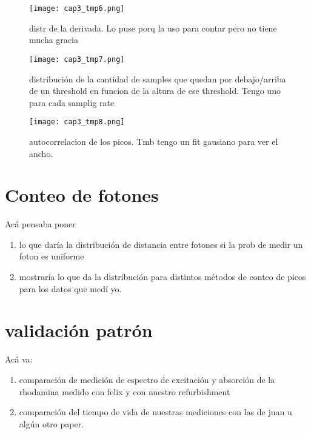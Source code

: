\begin{figure*}[h]
    \texttt{[image: cap3\_tmp6.png]}
    \caption{distr de la derivada. Lo puse porq la uso para contar pero no tiene mucha gracia}
    \label{fig:d}
\end{figure*}

\begin{figure*}[h]
    \texttt{[image: cap3\_tmp7.png]}
    \caption{distribución de la cantidad de samples que quedan por debajo/arriba de un threshold en funcion de la altura de ese threshold. Tengo uno para cada samplig rate}
    \label{fig:e}
\end{figure*}

\begin{figure*}[h]
    \texttt{[image: cap3\_tmp8.png]}
    \caption{autocorrelacion de los picos. Tmb tengo un fit gausiano para ver el ancho.}
    \label{fig:h}
\end{figure*}

\section{Conteo de fotones}

Acá pensaba poner 
\begin{enumerate}
    \item lo que daría la distribución de distancia entre fotones si la prob de medir un foton es uniforme
    \item mostraría lo que da la distribución para distintos métodos de conteo de picos para los datos que medí yo.
\end{enumerate}

\section{validación patrón}

Acá va:

\begin{enumerate}
    \item comparación de medición de espectro de excitación y absorción de la rhodamina medido con felix y con nuestro refurbishment
    \item comparación del tiempo de vida de nuestras mediciones con las de juan u algún otro paper.
\end{enumerate}

%
